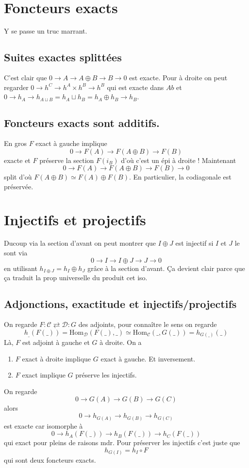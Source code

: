 \documentclass[a4paper,12pt]{book}
\newcommand{\Cat}{\mathcal{C}}
\newcommand{\Dat}{\mathcal{D}}
\newcommand{\Hom}{\textrm{Hom}}
\theoremstyle{plain}
\theoremstyle{definition}
\theoremstyle{remark}
\begin{document}
\section{Foncteurs exacts}
Y se passe un truc marrant.
\subsection{Suites exactes splittées}
C'est clair que $0\to A\to A\oplus B\to B\to 0$ est exacte. Pour à 
droite on peut regarder $0\to h^C \to h^A\times h^B\to h^B$ 
qui est exacte dans $Ab$ et 
$0\to h_A\to h_{A\sqcup B}=h_A\sqcup h_B=h_A\oplus h_B\to h_B$.

\subsection{Foncteurs exacts sont additifs.}
En gros $F$ exact à gauche implique
\[0\to F(A)\to F(A\oplus B)\to F(B)\]
exacte et $F$ préserve la section $F(i_B)$ d'où c'est un épi
à droite ! Maintenant 
\[0\to F(A)\to F(A\oplus B)\to F(B)\to 0\]
split d'où $F(A\oplus B)\simeq F(A)\oplus F(B)$. En particulier,
la codiagonale est préservée.


\section{Injectifs et projectifs}
Ducoup via la section d'avant on peut montrer que
$I\oplus J$ est injectif si $I$ et $J$ le sont via
\[0\to I\to I\oplus J\to J\to 0\]
en utilisant $h_{I\oplus J}=h_I\oplus h_J$ grâce à la section
d'avant. Ça devient clair parce que ça traduit la prop universelle
du produit cet iso.
\subsection{Adjonctions, exactitude et injectifs/projectifs}
On regarde $F\colon \Cat\rightleftarrows \Dat \colon G$ des 
adjoints, pour connaître le sens on regarde
\[h_{\_}(F(\_))=\Hom_{\Dat}(F(\_),\_)\simeq\Hom_{\Cat}(\_,G(\_))=h_{G(\_)}(\_)\]
Là, $F$ est adjoint à gauche et $G$ à droite. On a 
\begin{enumerate}
  \item $F$ exact à droite implique $G$ exact à gauche. Et
    inversement.
  \item $F$ exact implique $G$ préserve les injectifs.
\end{enumerate}
On regarde 
\[0\to G(A)\to G(B)\to G(C)\]
alors 
\[0\to h_{G(A)}\to h_{G(B)}\to h_{G(C)}\]
est exacte car isomorphe à
\[0\to h_{A}(F(\_))\to h_{B}(F(\_))\to h_{C}(F(\_))\]
qui exact pour pleins de raisons mdr. Pour préserver
les injectifs c'est juste que 
\[h_{G(I)}=h_{I}\circ F\]
qui sont deux foncteurs exacts.
\end{document}
